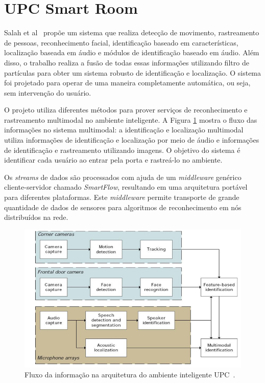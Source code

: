 
\section{UPC Smart Room}

Salah et al~\cite{salah} propõe um sistema que realiza detecção de movimento, rastreamento de pessoas, reconhecimento facial, identificação baseado em características, localização baseada em áudio e módulos de identificação baseado em áudio. Além disso, o trabalho realiza a fusão de todas essas informações utilizando filtro de partículas para obter um sistema robusto de identificação e localização. O sistema foi projetado para operar de uma maneira completamente automática, ou seja, sem intervenção do usuário.

O projeto utiliza diferentes métodos para prover serviços de reconhecimento e rastreamento multimodal no ambiente inteligente. A Figura \ref{workflow} mostra o fluxo das informações no sistema multimodal: a identificação e localização multimodal utiliza informações de identificação e localização por meio de áudio e informações de identificação e rastreamento utilizando imagens. O objetivo do sistema é identificar cada usuário ao entrar pela porta e rastreá-lo no ambiente. 

Os \textit{streams} de dados são processados com ajuda de um \textit{middleware} genérico cliente-servidor chamado \textit{SmartFlow}, resultando em uma arquitetura portável para diferentes plataformas. Este \textit{middleware} permite transporte de grande quantidade de dados de sensores para algoritmos de reconhecimento em nós distribuídos na rede.

	\begin{figure}[hbt]
		\begin{center}
			\includegraphics[scale=0.5]{figuras/3.TrabalhosCorrelatos/workflow.png}
		\end{center}
		\caption{Fluxo da informação na arquitetura do ambiente inteligente UPC~\cite{salah}.}
		\label{workflow}
	\end{figure}

